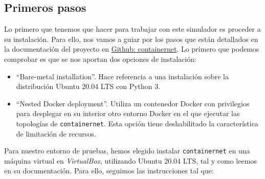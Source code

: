 \documentclass[a4paper, oneside, 12pt]{book}
\begin{document}
	\pagebreak
	
	\subsection{Primeros pasos}
	\noindent Lo primero que tenemos que hacer para trabajar con este simulador es proceder a su instalación. Para ello, nos vamos a guiar por los pasos que están detallados en la documentación del proyecto en \href{https://containernet.github.io/#installation}{Github: containernet}. Lo primero que podemos comprobar es que se nos aportan dos opciones de instalación:
	\begin{itemize}
		\item ``Bare-metal installation''. Hace referencia a una instalación sobre la distribución Ubuntu 20.04 LTS con Python 3.
		
		\item ``Nested Docker deployment''. Utiliza un contenedor Docker con privilegios para desplegar en su interior otro entorno Docker en el que ejecutar las topologías de \texttt{containernet}. Esta opción tiene deshabilitado la característica de limitación de recursos.
	\end{itemize}

	\noindent Para nuestro entorno de pruebas, hemos elegido instalar \texttt{containernet} en una máquina virtual en \textit{VirtualBox}, utilizando Ubuntu 20.04 LTS, tal y como leemos en su documentación. Para ello, seguimos las instrucciones tal que:
	
\end{document}
